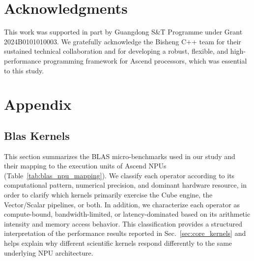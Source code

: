 \documentclass{article}
\begin{document}
\section*{Acknowledgments}
This work was supported in part by Guangdong S\&T Programme under Grant 2024B0101010003. We gratefully acknowledge the Bisheng C++ team for their sustained technical collaboration and for developing a robust, flexible, and high-performance programming framework for Ascend processors, which was essential to this study.


  
  

\section*{Appendix}
\label{artifact_descp}

\subsection{Blas Kernels}
\label{blas_operators}

This section summarizes the BLAS micro-benchmarks used in our study and their mapping to the execution units of Ascend NPUs (Table~\ref{tab:blas_npu_mapping}). We classify each operator according to its computational pattern, numerical precision, and dominant hardware resource, in order to clarify which kernels primarily exercise the Cube engine, the Vector/Scalar pipelines, or both. In addition, we characterize each operator as compute-bound, bandwidth-limited, or latency-dominated based on its arithmetic intensity and memory access behavior. This classification provides a structured interpretation of the performance results reported in Sec.~\ref{sec:core_kernels} and helps explain why different scientific kernels respond differently to the same underlying NPU architecture.
\end{document}
